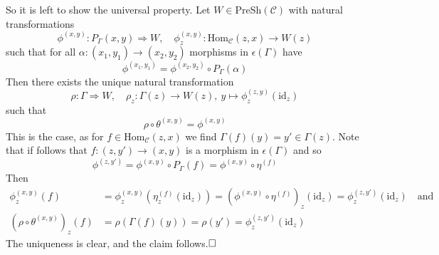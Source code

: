 So it is left to show the universal property. Let $W \in \mathrm{PreSh}(\mathcal{C})$ with natural transformations
\begin{equation*}
    \phi^{(x, y)}: P_\Gamma(x, y) \Rightarrow W, \quad \phi^{(x, y)}_z: \mathrm{Hom}_{\mathcal{C}}(z, x) \to W(z)
\end{equation*}
such that for all $\alpha: (x_1, y_1) \to (x_2, y_2)$ morphisms in $\epsilon(\Gamma)$ have
\begin{equation*}
    \phi^{(x_1, y_1)} = \phi^{(x_2, y_2)} \circ P_\Gamma(\alpha)
\end{equation*}
Then there exists the unique natural transformation
\begin{equation*}
    \rho: \Gamma \Rightarrow W, \quad \rho_z: \Gamma(z) \to W(z), \ y \mapsto \phi^{(z, y)}_z(\mathrm{id}_z)
\end{equation*}
such that
\begin{equation*}
    \rho \circ \theta^{(x, y)} = \phi^{(x, y)}
\end{equation*}
This is the case, as for $f \in \mathrm{Hom}_{\mathcal{C}}(z, x)$ we find $\Gamma(f)(y) = y' \in \Gamma(z)$.
Note that if follows that $f: (z, y') \to (x, y)$ is a morphism in $\epsilon(\Gamma)$ and so
\begin{equation*}
    \phi^{(z, y')} = \phi^{(x, y)} \circ P_\Gamma(f) = \phi^{(x, y)} \circ \eta^{(f)}
\end{equation*}
Then
\begin{align*}
    \phi^{(x, y)}_z(f) &= \phi^{(x,y)}_z(\eta^{(f)}_z(\mathrm{id}_z)) = (\phi^{(x, y)} \circ \eta^{(f)})_z(\mathrm{id}_z) = \phi^{(z, y')}_z(\mathrm{id}_z) \quad \text{and} \\
    (\rho \circ \theta^{(x, y)})_z(f) &= \rho(\Gamma(f)(y)) = \rho(y') = \phi_z^{(z, y')}(\mathrm{id}_z)
\end{align*}
The uniqueness is clear, and the claim follows.$\hfill\square$

